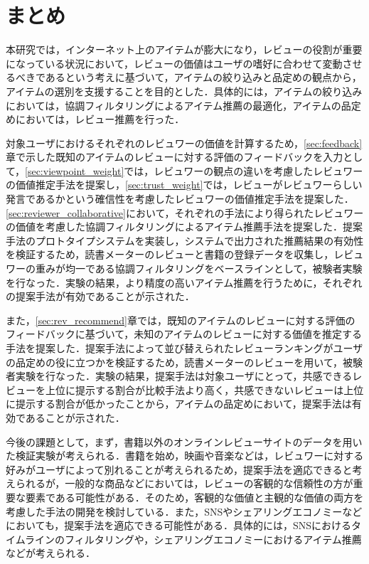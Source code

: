 \documentclass[a4paper,11pt,oneside,openany]{jsbook}
\begin{document}
\chapter{まとめ}
本研究では，インターネット上のアイテムが膨大になり，レビューの役割が重要になっている状況において，レビューの価値はユーザの嗜好に合わせて変動させるべきであるという考えに基づいて，アイテムの絞り込みと品定めの観点から，アイテムの選別を支援することを目的とした．具体的には，アイテムの絞り込みにおいては，協調フィルタリングによるアイテム推薦の最適化，アイテムの品定めにおいては，レビュー推薦を行った．
\par
対象ユーザにおけるそれぞれのレビュワーの価値を計算するため，\ref{sec:feedback}章で示した既知のアイテムのレビューに対する評価のフィードバックを入力として，\ref{sec:viewpoint_weight}では，レビュワーの観点の違いを考慮したレビュワーの価値推定手法を提案し，\ref{sec:trust_weight}では，レビューがレビュワーらしい発言であるかという確信性を考慮したレビュワーの価値推定手法を提案した．\ref{sec:reviewer_collaborative}において，それぞれの手法により得られたレビュワーの価値を考慮した協調フィルタリングによるアイテム推薦手法を提案した．提案手法のプロトタイプシステムを実装し，システムで出力された推薦結果の有効性を検証するため，読書メーターのレビューと書籍の登録データを収集し，レビュワーの重みが均一である協調フィルタリングをベースラインとして，被験者実験を行なった．実験の結果，より精度の高いアイテム推薦を行うために，それぞれの提案手法が有効であることが示された．
\par
また，\ref{sec:rev_recommend}章では，既知のアイテムのレビューに対する評価のフィードバックに基づいて，未知のアイテムのレビューに対する価値を推定する手法を提案した．提案手法によって並び替えられたレビューランキングがユーザの品定めの役に立つかを検証するため，読書メーターのレビューを用いて，被験者実験を行なった．実験の結果，提案手法は対象ユーザにとって，共感できるレビューを上位に提示する割合が比較手法より高く，共感できないレビューは上位に提示する割合が低かったことから，アイテムの品定めにおいて，提案手法は有効であることが示された．
\par
今後の課題として，まず，書籍以外のオンラインレビューサイトのデータを用いた検証実験が考えられる．書籍を始め，映画や音楽などは，レビュワーに対する好みがユーザによって別れることが考えられるため，提案手法を適応できると考えられるが，一般的な商品などにおいては，レビューの客観的な信頼性の方が重要な要素である可能性がある．そのため，客観的な価値と主観的な価値の両方を考慮した手法の開発を検討している．また，SNSやシェアリングエコノミーなどにおいても，提案手法を適応できる可能性がある．具体的には，SNSにおけるタイムラインのフィルタリングや，シェアリングエコノミーにおけるアイテム推薦などが考えられる．
\end{document}
